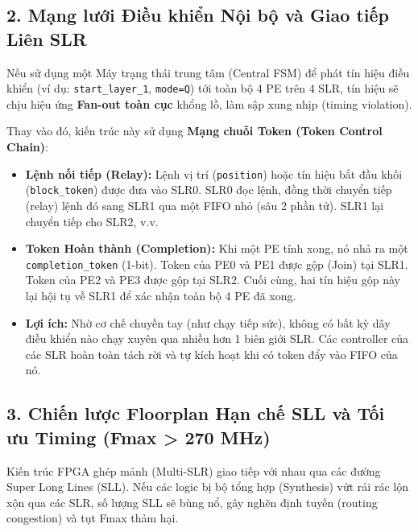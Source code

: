 \documentclass[12pt,a4paper]{article}
\begin{document}
\subsection{2. Mạng lưới Điều khiển Nội bộ và Giao tiếp Liên SLR}
Nếu sử dụng một Máy trạng thái trung tâm (Central FSM) để phát tín hiệu điều khiển (ví dụ: \texttt{start\_layer\_1}, \texttt{mode=Q}) tới toàn bộ 4 PE trên 4 SLR, tín hiệu sẽ chịu hiệu ứng \textbf{Fan-out toàn cục} khổng lồ, làm sập xung nhịp (timing violation).

Thay vào đó, kiến trúc này sử dụng \textbf{Mạng chuỗi Token (Token Control Chain)}:
\begin{itemize}
    \item \textbf{Lệnh nối tiếp (Relay):} Lệnh vị trí (\texttt{position}) hoặc tín hiệu bắt đầu khối (\texttt{block\_token}) được đưa vào SLR0. SLR0 đọc lệnh, đồng thời chuyển tiếp (relay) lệnh đó sang SLR1 qua một FIFO nhỏ (sâu 2 phần tử). SLR1 lại chuyển tiếp cho SLR2, v.v.
    \item \textbf{Token Hoàn thành (Completion):} Khi một PE tính xong, nó nhả ra một \texttt{completion\_token} (1-bit). Token của PE0 và PE1 được gộp (Join) tại SLR1. Token của PE2 và PE3 được gộp tại SLR2. Cuối cùng, hai tín hiệu gộp này lại hội tụ về SLR1 để xác nhận toàn bộ 4 PE đã xong.
    \item \textbf{Lợi ích:} Nhờ cơ chế chuyền tay (như chạy tiếp sức), không có bất kỳ dây điều khiển nào chạy xuyên qua nhiều hơn 1 biên giới SLR. Các controller của các SLR hoàn toàn tách rời và tự kích hoạt khi có token đẩy vào FIFO của nó.
\end{itemize}

\subsection{3. Chiến lược Floorplan Hạn chế SLL và Tối ưu Timing (Fmax > 270 MHz)}
Kiến trúc FPGA ghép mảnh (Multi-SLR) giao tiếp với nhau qua các đường Super Long Lines (SLL). Nếu các logic bị bộ tổng hợp (Synthesis) vứt rải rác lộn xộn qua các SLR, số lượng SLL sẽ bùng nổ, gây nghẽn định tuyến (routing congestion) và tụt Fmax thảm hại.
\end{document}
